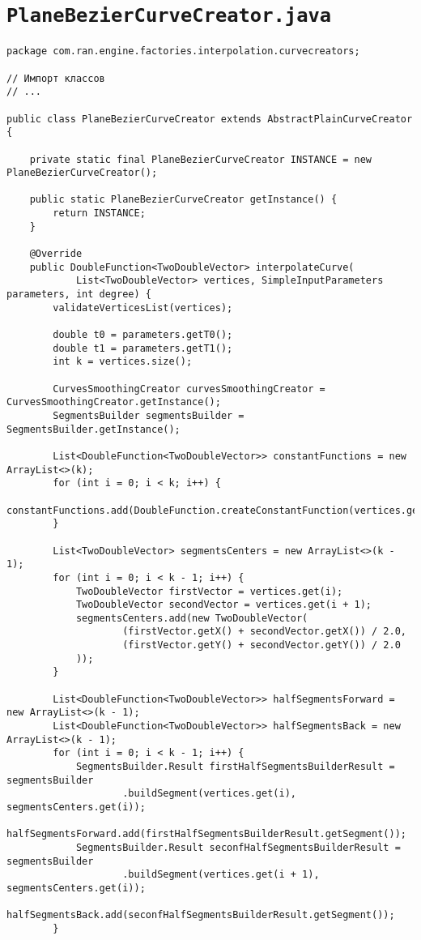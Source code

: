 \section*{\texttt{PlaneBezierCurveCreator.java}}
\begin{verbatim}
package com.ran.engine.factories.interpolation.curvecreators;

// Импорт классов
// ...

public class PlaneBezierCurveCreator extends AbstractPlainCurveCreator {

    private static final PlaneBezierCurveCreator INSTANCE = new PlaneBezierCurveCreator();

    public static PlaneBezierCurveCreator getInstance() {
        return INSTANCE;
    }

    @Override
    public DoubleFunction<TwoDoubleVector> interpolateCurve(
            List<TwoDoubleVector> vertices, SimpleInputParameters parameters, int degree) {
        validateVerticesList(vertices);

        double t0 = parameters.getT0();
        double t1 = parameters.getT1();
        int k = vertices.size();

        CurvesSmoothingCreator curvesSmoothingCreator = CurvesSmoothingCreator.getInstance();
        SegmentsBuilder segmentsBuilder = SegmentsBuilder.getInstance();

        List<DoubleFunction<TwoDoubleVector>> constantFunctions = new ArrayList<>(k);
        for (int i = 0; i < k; i++) {
            constantFunctions.add(DoubleFunction.createConstantFunction(vertices.get(i)));
        }

        List<TwoDoubleVector> segmentsCenters = new ArrayList<>(k - 1);
        for (int i = 0; i < k - 1; i++) {
            TwoDoubleVector firstVector = vertices.get(i);
            TwoDoubleVector secondVector = vertices.get(i + 1);
            segmentsCenters.add(new TwoDoubleVector(
                    (firstVector.getX() + secondVector.getX()) / 2.0,
                    (firstVector.getY() + secondVector.getY()) / 2.0
            ));
        }

        List<DoubleFunction<TwoDoubleVector>> halfSegmentsForward = new ArrayList<>(k - 1);
        List<DoubleFunction<TwoDoubleVector>> halfSegmentsBack = new ArrayList<>(k - 1);
        for (int i = 0; i < k - 1; i++) {
            SegmentsBuilder.Result firstHalfSegmentsBuilderResult = segmentsBuilder
                    .buildSegment(vertices.get(i), segmentsCenters.get(i));
            halfSegmentsForward.add(firstHalfSegmentsBuilderResult.getSegment());
            SegmentsBuilder.Result seconfHalfSegmentsBuilderResult = segmentsBuilder
                    .buildSegment(vertices.get(i + 1), segmentsCenters.get(i));
            halfSegmentsBack.add(seconfHalfSegmentsBuilderResult.getSegment());
        }


\end{verbatim}
